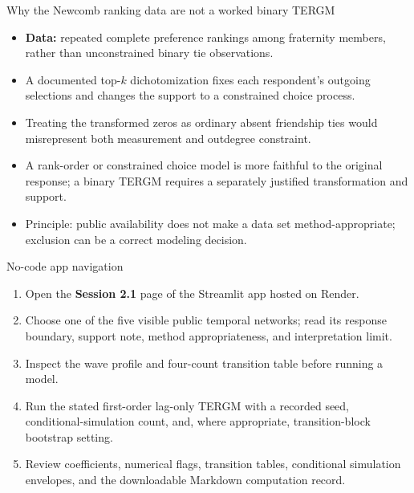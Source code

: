 \documentclass[aspectratio=169,11pt]{beamer}
\newcommand{\term}[1]{\textbf{\color{nupurple}#1}}
\begin{document}
\begin{frame}{Why the Newcomb ranking data are not a worked binary TERGM}
\begin{itemize}
\item \term{Data:} repeated complete preference rankings among fraternity members, rather than unconstrained binary tie observations.
\item A documented top-$k$ dichotomization fixes each respondent's outgoing selections and changes the support to a constrained choice process.
\item Treating the transformed zeros as ordinary absent friendship ties would misrepresent both measurement and outdegree constraint.
\item A rank-order or constrained choice model is more faithful to the original response; a binary TERGM requires a separately justified transformation and support.
\item \alert{Principle:} public availability does not make a data set method-appropriate; exclusion can be a correct modeling decision.
\end{itemize}
\end{frame}

\begin{frame}{No-code app navigation}
\begin{enumerate}
\item Open the \term{Session 2.1} page of the Streamlit app hosted on Render.
\item Choose one of the five visible public temporal networks; read its response boundary, support note, method appropriateness, and interpretation limit.
\item Inspect the wave profile and four-count transition table before running a model.
\item Run the stated first-order lag-only TERGM with a recorded seed, conditional-simulation count, and, where appropriate, transition-block bootstrap setting.
\item Review coefficients, numerical flags, transition tables, conditional simulation envelopes, and the downloadable Markdown computation record.
\end{enumerate}
\end{frame}
\end{document}
